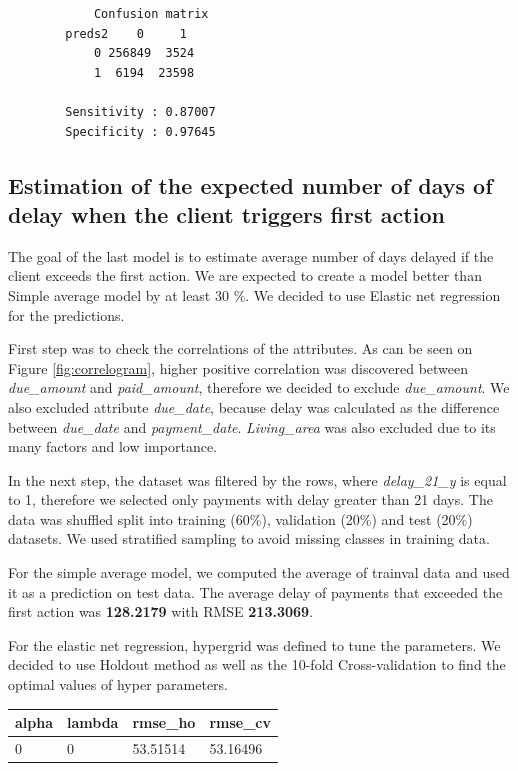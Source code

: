 \documentclass[
]{article}
\begin{document}
\begin{verbatim}
            Confusion matrix
        preds2    0     1
            0 256849  3524
            1  6194  23598
        
        Sensitivity : 0.87007         
        Specificity : 0.97645 
\end{verbatim}

\hypertarget{estimation-of-the-expected-number-of-days-of-delay-when-the-client-triggers-first-action}{%
\subsection{Estimation of the expected number of days of delay when the client triggers first action}\label{estimation-of-the-expected-number-of-days-of-delay-when-the-client-triggers-first-action}}

The goal of the last model is to estimate average number of days delayed if the client exceeds the first action.
We are expected to create a model better than Simple average model by at least 30 \%. We decided to use
Elastic net regression for the predictions.

First step was to check the correlations of the attributes. As can be seen on Figure \ref{fig:correlogram}, higher positive correlation was discovered between \emph{due\_amount} and \emph{paid\_amount}, therefore we decided to exclude \emph{due\_amount}. We also excluded attribute \emph{due\_date}, because delay was calculated as the difference between \emph{due\_date} and \emph{payment\_date}. \emph{Living\_area} was also excluded due to its many factors and low importance.

In the next step, the dataset was filtered by the rows, where \emph{delay\_21\_y} is equal to 1, therefore we selected only payments with delay greater than 21 days. The data was shuffled split into training (60\%), validation (20\%) and test (20\%) datasets. We used stratified sampling to avoid missing classes in training data.

For the simple average model, we computed the average of trainval data and used it as a prediction on test data. The average delay of payments that exceeded the first action was \textbf{128.2179} with RMSE \textbf{213.3069}.

For the elastic net regression, hypergrid was defined to tune the parameters. We decided to use Holdout method as well as the 10-fold Cross-validation to find the optimal values of hyper parameters.

\begin{longtable}[]{@{}llll@{}}
\toprule
alpha & lambda & rmse\_ho & rmse\_cv\tabularnewline
\midrule
\endhead
0 & 0 & 53.51514 & 53.16496\tabularnewline
\bottomrule
\end{longtable}
\end{document}
